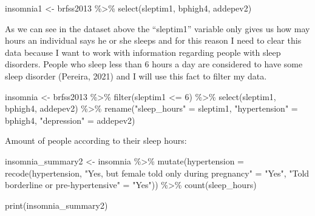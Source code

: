 \documentclass[
]{article}
\newenvironment{Shaded}{\begin{snugshade}}{\end{snugshade}}
\newcommand{\AttributeTok}[1]{\textcolor[rgb]{0.77,0.63,0.00}{#1}}
\newcommand{\DecValTok}[1]{\textcolor[rgb]{0.00,0.00,0.81}{#1}}
\newcommand{\FunctionTok}[1]{\textcolor[rgb]{0.00,0.00,0.00}{#1}}
\newcommand{\NormalTok}[1]{#1}
\newcommand{\OtherTok}[1]{\textcolor[rgb]{0.56,0.35,0.01}{#1}}
\newcommand{\SpecialCharTok}[1]{\textcolor[rgb]{0.00,0.00,0.00}{#1}}
\newcommand{\StringTok}[1]{\textcolor[rgb]{0.31,0.60,0.02}{#1}}
\begin{document}
\begin{Shaded}
\begin{Highlighting}[]
\NormalTok{insomnia1 }\OtherTok{\textless{}{-}}\NormalTok{ brfss2013 }\SpecialCharTok{\%\textgreater{}\%} 
  \FunctionTok{select}\NormalTok{(sleptim1, bphigh4, addepev2)}
\end{Highlighting}
\end{Shaded}

As we can see in the dataset above the ``sleptim1'' variable only gives
us how may hours an individual says he or she sleeps and for this reason
I need to clear this data because I want to work with information
regarding people with sleep disorders. People who sleep less than 6
hours a day are considered to have some sleep disorder (Pereira, 2021)
and I will use this fact to filter my data.

\begin{Shaded}
\begin{Highlighting}[]
\NormalTok{insomnia }\OtherTok{\textless{}{-}}\NormalTok{ brfss2013 }\SpecialCharTok{\%\textgreater{}\%} 
  \FunctionTok{filter}\NormalTok{(sleptim1 }\SpecialCharTok{\textless{}=} \DecValTok{6}\NormalTok{) }\SpecialCharTok{\%\textgreater{}\%} 
  \FunctionTok{select}\NormalTok{(sleptim1, bphigh4, addepev2) }\SpecialCharTok{\%\textgreater{}\%} 
  \FunctionTok{rename}\NormalTok{(}\StringTok{"sleep\_hours"} \OtherTok{=}\NormalTok{ sleptim1,}
         \StringTok{"hypertension"} \OtherTok{=}\NormalTok{ bphigh4,}
         \StringTok{"depression"} \OtherTok{=}\NormalTok{ addepev2)}
\end{Highlighting}
\end{Shaded}

Amount of people according to their sleep hours:

\begin{Shaded}
\begin{Highlighting}[]
\NormalTok{insomnia\_summary2 }\OtherTok{\textless{}{-}}\NormalTok{ insomnia }\SpecialCharTok{\%\textgreater{}\%} 
  \FunctionTok{mutate}\NormalTok{(}\AttributeTok{hypertension =} \FunctionTok{recode}\NormalTok{(hypertension,}
                               \StringTok{"Yes, but female told only during pregnancy"} \OtherTok{=} \StringTok{"Yes"}\NormalTok{,}
                               \StringTok{"Told borderline or pre{-}hypertensive"} \OtherTok{=} \StringTok{"Yes"}\NormalTok{)) }\SpecialCharTok{\%\textgreater{}\%} 
  \FunctionTok{count}\NormalTok{(sleep\_hours)}

\FunctionTok{print}\NormalTok{(insomnia\_summary2)}
\end{Highlighting}
\end{Shaded}
\end{document}
